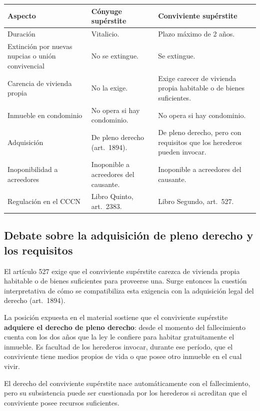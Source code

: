 \documentclass[12pt,oneside]{book}
\begin{document}
\begin{table}[H]
\centering
\begin{tabularx}{\textwidth}{@{}>{\raggedright\arraybackslash}p{}>{\raggedright\arraybackslash}X>{\raggedright\arraybackslash}X@{}}
\toprule
\textbf{Aspecto} & \textbf{Cónyuge supérstite} & \textbf{Conviviente supérstite} \\
\midrule
Duración & Vitalicio. & Plazo máximo de 2 años. \\
Extinción por nuevas nupcias o unión convivencial & No se extingue. & Se extingue. \\
Carencia de vivienda propia & No la exige. & Exige carecer de vivienda propia habitable o de bienes suficientes. \\
Inmueble en condominio & No opera si hay condominio. & No opera si hay condominio. \\
Adquisición & De pleno derecho (art.~1894). & De pleno derecho, pero con requisitos que los herederos pueden invocar. \\
Inoponibilidad a acreedores & Inoponible a acreedores del causante. & Inoponible a acreedores del causante. \\
Regulación en el CCCN & Libro Quinto, art.~2383. & Libro Segundo, art.~527. \\
\bottomrule
\end{tabularx}
\end{table}

\subsection{Debate sobre la adquisición de pleno derecho y los requisitos}

El artículo 527 exige que el conviviente supérstite carezca de vivienda propia habitable o de bienes suficientes para proveerse una. Surge entonces la cuestión interpretativa de cómo se compatibiliza esta exigencia con la adquisición legal del derecho (art.~1894).

La posición expuesta en el material sostiene que el conviviente supérstite \textbf{adquiere el derecho de pleno derecho}: desde el momento del fallecimiento cuenta con los dos años que la ley le confiere para habitar gratuitamente el inmueble. Es facultad de los herederos invocar, durante ese período, que el conviviente tiene medios propios de vida o que posee otro inmueble en el cual vivir.

\begin{important}
El derecho del conviviente supérstite nace automáticamente con el fallecimiento, pero su subsistencia puede ser cuestionada por los herederos si acreditan que el conviviente posee recursos suficientes.
\end{important}
\end{document}

